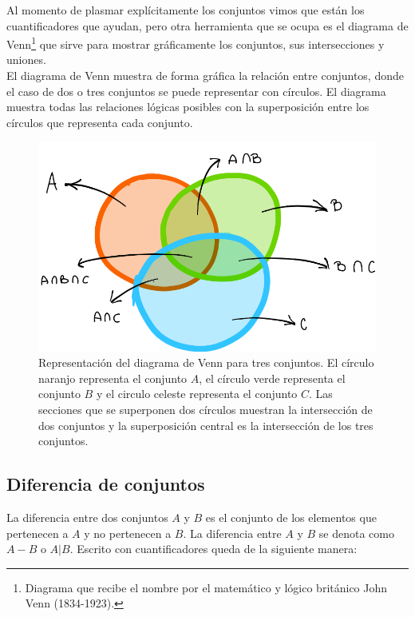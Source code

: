 Al momento de plasmar explícitamente los conjuntos vimos que están los cuantificadores que ayudan, pero otra herramienta que se ocupa es el diagrama de Venn\footnote{Diagrama que recibe el nombre por el matemático y lógico británico John Venn (1834-1923).} que sirve para mostrar gráficamente los conjuntos, sus intersecciones y uniones.\\

El diagrama de Venn muestra de forma gráfica la relación entre conjuntos, donde el caso de dos o tres conjuntos se puede representar con círculos. El diagrama muestra todas las relaciones lógicas posibles con la superposición entre los círculos que representa cada conjunto.\\
\begin{center}
	\begin{figure}[ht!]
	\centering
    		\includegraphics[scale=0.35]{FiguresBM/DV0.png}
    		\caption[Representación del diagrama de Venn para tres conjuntos]{Representación del diagrama de Venn para tres conjuntos. El círculo naranjo representa el conjunto $A$, el círculo verde representa el conjunto $B$ y el circulo celeste representa el conjunto $C$. Las secciones que se superponen dos círculos muestran la intersección de dos conjuntos y la superposición central es la intersección de los tres conjuntos.}
	\end{figure}
\end{center}

\subsection{Diferencia de conjuntos}
La diferencia entre dos conjuntos $A$ y $B$ es el conjunto de los elementos que pertenecen a $A$ y no pertenecen a $B$. La diferencia entre $A$ y $B$ se denota como $A-B$ o $A|B$. Escrito con cuantificadores queda de la siguiente manera: \\

